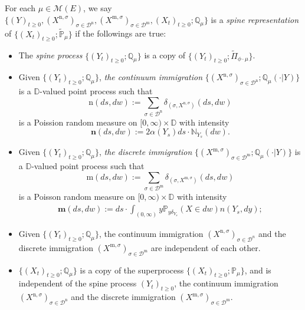 \documentclass[12pt,a4paper]{amsart}
\numberwithin{equation}{section}
\theoremstyle{plain}
\theoremstyle{definition}
\begin{document}
For each $\mu \in \mathcal M(E)$, we say $\{(Y)_{t\geq 0}, (X^{\mathrm n,
  \sigma})_{\sigma\in \mathcal D^\mathrm n}, (X^{\mathrm m, \sigma})_{\sigma \in
  \mathcal D^\mathrm m}, (X_t)_{t\geq 0}; \mathbb Q_{\mu}\}$ is a \emph{spine representation} of $\{(X_t)_{t\geq 0}; \widetilde {\mathbb P}_\mu\}$ if the followings are true:
\begin{itemize}
\item
  The \emph{spine process} $\{(Y_t)_{t\geq 0}; \mathbb Q_\mu\}$ is a copy of
  $\{(Y_t)_{t\geq 0}; \widetilde \Pi_{\phi\cdot\mu}\}$.
\item
  Given $\{(Y_t)_{t\geq 0}; \mathbb Q_\mu\}$, \emph{the continuum immigration} $\{ (X^{\mathrm n,\sigma})_{\sigma \in \mathcal D^\mathrm n};
  \mathbb Q_\mu(\cdot |Y)\}$ is a $\mathbb D$-valued point process such that
  \[
    \mathrm n(ds,dw) := \sum_{\sigma\in \mathcal D^{\mathrm n}} \delta_{(\sigma, X^{\mathrm n,\sigma})}(ds,dw)
  \]
  is a Poission random measure on $[0,\infty)\times \mathbb D$ with intensity
  \[
    \mathbf n(ds,dw):= 2 \alpha(Y_s) ds \cdot \mathbb N_{Y_s}(dw).
  \]
\item
  Given $\{(Y_t)_{t\geq 0}; \mathbb Q_\mu\}$, \emph{the discrete immigration} $\{(X^{\mathrm m,\sigma})_{\sigma\in \mathcal D^{\mathrm m}};
  \mathbb Q_\mu(\cdot |Y)\}$ is a $\mathbb D$-valued point process such that
  \[
    \mathrm m(ds,dw) := \sum_{\sigma\in \mathcal D^{\mathrm m}} \delta_{(\sigma, X^{\mathrm m,\sigma})}(ds,dw)
  \]
  is a Poisson random measure on $[0,\infty ) \times \mathbb D$ with intensity
  \begin{align}\label{eq:meanMeasImmigr}
    \mathbf m(ds,dw):= ds \cdot \int_{(0,\infty)} y \mathbb P_{y\delta_{Y_s}}(X\in dw) n(Y_s,dy);
  \end{align}
\item
  Given $\{(Y_t)_{t\geq 0}; \mathbb Q_\mu\}$, the continuum immigration $(X^{\mathrm n,\sigma})_{\sigma \in \mathcal D^n}$ and the discrete immigration $(X^{\mathrm m,\sigma})_{\sigma\in \mathcal D^{\mathrm m}}$ are independent of each other.
\item
	$\{(X_t)_{t\geq 0}; \mathbb Q_\mu\}$ is a copy of the superprocess $\{(X_t)_{t\geq 0}; \mathbb P_\mu\}$, and is independent of the spine process $(Y_t)_{t\geq 0}$, the continuum immigration $(X^{\mathrm n,\sigma})_{\sigma
    \in \mathcal D^\mathrm n}$ and the discrete immigration $(X^{\mathrm
    m,\sigma})_{\sigma\in \mathcal D^{\mathrm m}}$.
\end{itemize}
\end{document}
